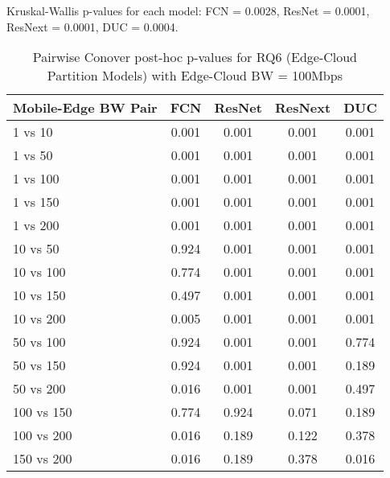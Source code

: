 \begin{table}[h]
\centering
\caption{Pairwise Conover post-hoc p-values for RQ6 (Edge-Cloud Partition Models) with Edge-Cloud BW = 100Mbps}
\label{tab:conover_edge_cloud_partition_ec100}
\smallskip
Kruskal-Wallis p-values for each model: FCN = 0.0028, ResNet = 0.0001, ResNext = 0.0001, DUC = 0.0004.

\begin{tabular}{lcccc}
\toprule
Mobile-Edge BW Pair & FCN & ResNet & ResNext & DUC \\
\midrule
1 vs 10 & 0.001 & 0.001 & 0.001 & 0.001 \\
1 vs 50 & 0.001 & 0.001 & 0.001 & 0.001 \\
1 vs 100 & 0.001 & 0.001 & 0.001 & 0.001 \\
1 vs 150 & 0.001 & 0.001 & 0.001 & 0.001 \\
1 vs 200 & 0.001 & 0.001 & 0.001 & 0.001 \\
10 vs 50 & 0.924 & 0.001 & 0.001 & 0.001 \\
10 vs 100 & 0.774 & 0.001 & 0.001 & 0.001 \\
10 vs 150 & 0.497 & 0.001 & 0.001 & 0.001 \\
10 vs 200 & 0.005 & 0.001 & 0.001 & 0.001 \\
50 vs 100 & 0.924 & 0.001 & 0.001 & 0.774 \\
50 vs 150 & 0.924 & 0.001 & 0.001 & 0.189 \\
50 vs 200 & 0.016 & 0.001 & 0.001 & 0.497 \\
100 vs 150 & 0.774 & 0.924 & 0.071 & 0.189 \\
100 vs 200 & 0.016 & 0.189 & 0.122 & 0.378 \\
150 vs 200 & 0.016 & 0.189 & 0.378 & 0.016 \\
\bottomrule
\end{tabular}
\end{table}

